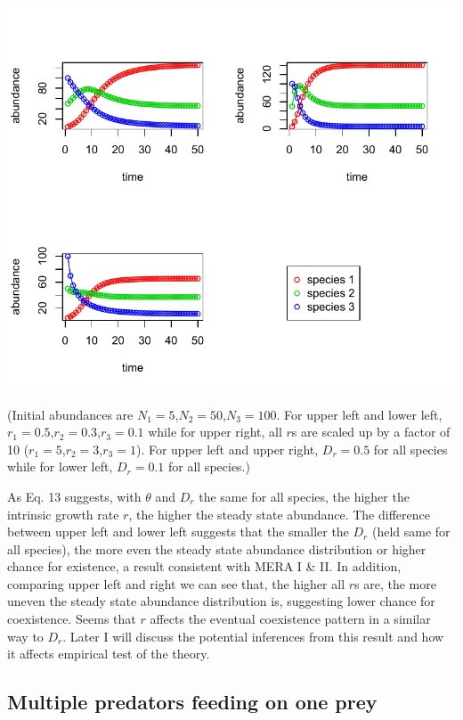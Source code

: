 \documentclass[12pt]{article}
\begin{document}
\includegraphics[width=\textwidth]{integrated_multi_competitors.pdf}

(Initial abundances are $N_1=5$,$N_2=50$,$N_3=100$. For upper left and lower left, $r_1=0.5$,$r_2=0.3$,$r_3=0.1$ while for upper right, all $r$s are scaled up by a factor of 10 ($r_1=5$,$r_2=3$,$r_3=1$). For upper left and upper right, $D_r=0.5$ for all species while for lower left, $D_r=0.1$ for all species.)

As Eq. 13 suggests, with $\theta$ and $D_r$ the same for all species, the higher the intrinsic growth rate $r$, the higher the steady state abundance. The difference between upper left and lower left suggests that the smaller the $D_r$ (held same for all species), the more even the steady state abundance distribution or higher chance for existence, a result consistent with MERA I \& II. In addition, comparing upper left and right we can see that, the higher all $r$s are, the more uneven the steady state abundance distribution is, suggesting lower chance for coexistence. Seems that $r$ affects the eventual coexistence pattern in a similar way to $D_r$. Later I will discuss the potential inferences  from this result and how it affects empirical test of the theory.

\subsection{Multiple predators feeding on one prey}
\end{document}
